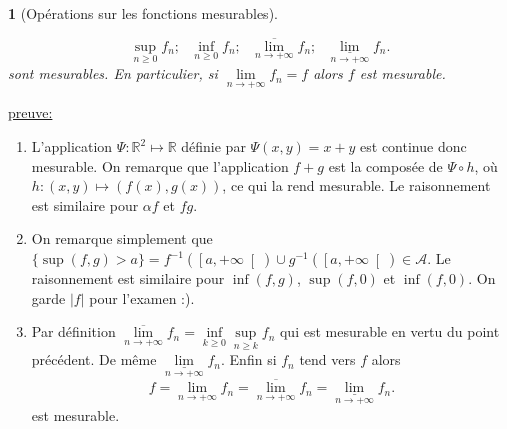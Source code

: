 \documentclass[8pt,notheorems]{beamer}
\def \R{\mathbb R}
\def \limsup{\underset{n\rightarrow+\infty}{\overline{\lim}}}
\def \liminf{\underset{n\rightarrow+\infty}{\underline{\lim}}}
\newtheorem{prop}{\translate{Proposition}}
\theoremstyle{definition}
\theoremstyle{example}
\theoremstyle{mystyle}
\theoremstyle{plain}
\begin{document}
\begin{frame}[allowframebreaks]
\begin{prop}[Opérations sur les fonctions mesurables]
\begin{enumerate}
    $$\underset{n\geq 0}{\sup} f_n;\text{ }\underset{n\geq 0}{\inf} f_n;\text{ }\limsup f_n;\text{ }\liminf f_n.
    $$
    sont mesurables. En particulier, si $\underset{n\rightarrow + \infty}{\lim}f_n = f$ alors $f$ est mesurable.
\end{enumerate}
\end{prop}
\underline{preuve:}
\begin{enumerate}
    \item L'application $\Psi:\R^2\mapsto \R$ définie par $\Psi(x,y)= x+y$ est continue donc mesurable. On remarque que l'application $f+g$ est la composée de $\Psi\circ h$, où $h:(x,y)\mapsto (f(x), g(x))$, ce qui la rend mesurable. Le raisonnement est similaire pour $\alpha f$ et $fg$.
    \item On remarque simplement que $\{\sup(f,g)>a\} = f^{-1}(\left[a,+\infty\right[)\cup g^{-1}(\left[a,+\infty\right[)\in\mathcal{A}$. Le raisonnement est similaire pour $\inf(f,g)$, $\sup(f,0)$ et $\inf(f,0)$. On garde $|f|$ pour l'examen :).
    \item Par définition $\limsup f_n = \underset{k\geq0}{\inf}\underset{n\geq k}{\sup}f_n$ qui est mesurable en vertu du point précédent. De même $\liminf f_n$. Enfin si $f_n$ tend vers $f$ alors 
    $$
    f = \underset{n\rightarrow+\infty}{\lim} f_n =\limsup f_n= \liminf f_n.
    $$ 
    est mesurable.
\end{enumerate}
\end{frame}
\end{document}
